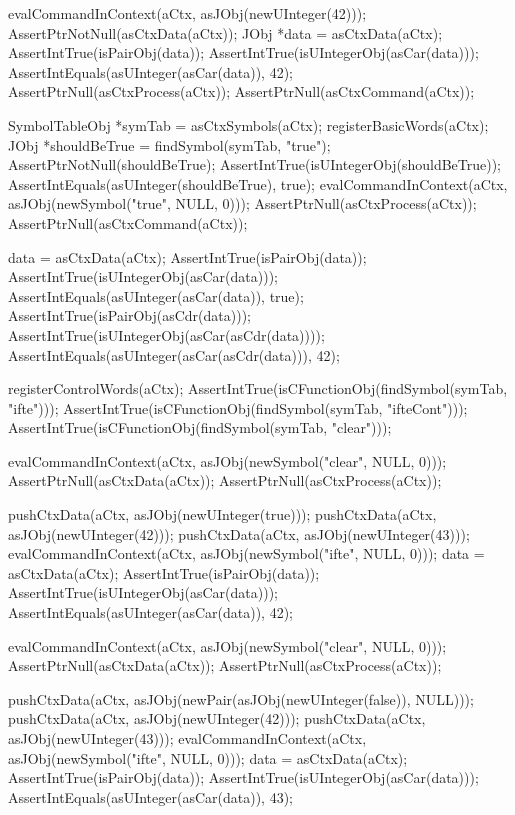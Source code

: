   evalCommandInContext(aCtx, asJObj(newUInteger(42)));
  AssertPtrNotNull(asCtxData(aCtx));
  JObj *data = asCtxData(aCtx);
  AssertIntTrue(isPairObj(data));
  AssertIntTrue(isUIntegerObj(asCar(data)));
  AssertIntEquals(asUInteger(asCar(data)), 42);
  AssertPtrNull(asCtxProcess(aCtx));
  AssertPtrNull(asCtxCommand(aCtx));

  SymbolTableObj *symTab = asCtxSymbols(aCtx);
  registerBasicWords(aCtx);
  JObj *shouldBeTrue = findSymbol(symTab, "true");
  AssertPtrNotNull(shouldBeTrue);
  AssertIntTrue(isUIntegerObj(shouldBeTrue));
  AssertIntEquals(asUInteger(shouldBeTrue), true);
  evalCommandInContext(aCtx, asJObj(newSymbol("true", NULL, 0)));
  AssertPtrNull(asCtxProcess(aCtx));
  AssertPtrNull(asCtxCommand(aCtx));  

  data = asCtxData(aCtx);
  AssertIntTrue(isPairObj(data));
  AssertIntTrue(isUIntegerObj(asCar(data)));
  AssertIntEquals(asUInteger(asCar(data)), true);
  AssertIntTrue(isPairObj(asCdr(data)));
  AssertIntTrue(isUIntegerObj(asCar(asCdr(data))));
  AssertIntEquals(asUInteger(asCar(asCdr(data))), 42);
    
  registerControlWords(aCtx);
  AssertIntTrue(isCFunctionObj(findSymbol(symTab, "ifte")));
  AssertIntTrue(isCFunctionObj(findSymbol(symTab, "ifteCont")));
  AssertIntTrue(isCFunctionObj(findSymbol(symTab, "clear")));
  
  evalCommandInContext(aCtx, asJObj(newSymbol("clear", NULL, 0)));
  AssertPtrNull(asCtxData(aCtx));
  AssertPtrNull(asCtxProcess(aCtx));
  
  pushCtxData(aCtx, asJObj(newUInteger(true)));
  pushCtxData(aCtx, asJObj(newUInteger(42)));
  pushCtxData(aCtx, asJObj(newUInteger(43)));
  evalCommandInContext(aCtx, asJObj(newSymbol("ifte", NULL, 0)));
  data = asCtxData(aCtx);
  AssertIntTrue(isPairObj(data));
  AssertIntTrue(isUIntegerObj(asCar(data)));
  AssertIntEquals(asUInteger(asCar(data)), 42);
  
  evalCommandInContext(aCtx, asJObj(newSymbol("clear", NULL, 0)));
  AssertPtrNull(asCtxData(aCtx));
  AssertPtrNull(asCtxProcess(aCtx));
  
  pushCtxData(aCtx, asJObj(newPair(asJObj(newUInteger(false)), NULL)));
  pushCtxData(aCtx, asJObj(newUInteger(42)));
  pushCtxData(aCtx, asJObj(newUInteger(43)));
  evalCommandInContext(aCtx, asJObj(newSymbol("ifte", NULL, 0)));
  data = asCtxData(aCtx);
  AssertIntTrue(isPairObj(data));
  AssertIntTrue(isUIntegerObj(asCar(data)));
  AssertIntEquals(asUInteger(asCar(data)), 43);
\stopCTest

\stopTestCase
\stopTestSuite
